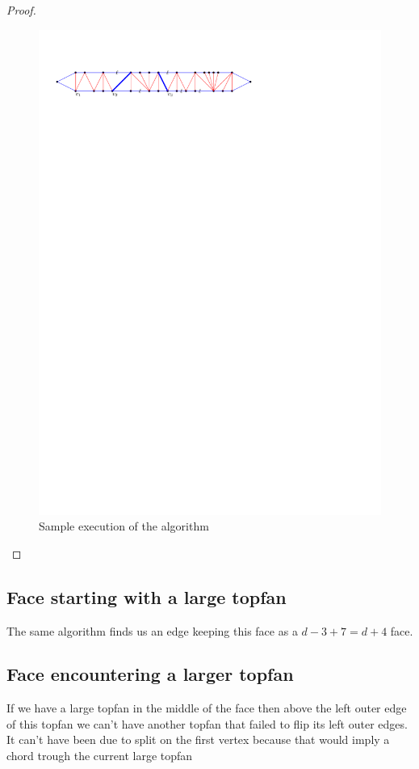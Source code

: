 \begin{proof}
\begin{figure}[h]
  \centering
  \includegraphics[scale=1]{blueFaceSubdivision/img/sampleExecution}
  \caption{Sample execution of the algorithm}
  \label{fig:subdiv:sampleExecution}
\end{figure}

\end{proof}


\subsection{Face starting with a large topfan}
The same algorithm finds us an edge keeping this face as a $ d - 3 +7 = d+4$ face.

\subsection{Face encountering a larger topfan}
If we have a large topfan in the middle of the face then above the left outer edge of this topfan we can't have another topfan that failed to flip its left outer edges.
It can't have been due to split on the first vertex because that would imply a chord trough the current large topfan 

